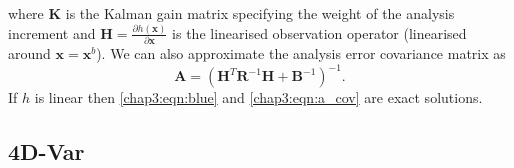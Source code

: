 where \textbf{K} is the Kalman gain matrix specifying the weight of the analysis increment and \(\textbf{H}=\frac{\partial h(\textbf{x})}{\partial \textbf{x}}\) is the linearised observation operator (linearised around \(\textbf{x}=\textbf{x}^{b}\)). We can also approximate the analysis error covariance matrix as
\begin{equation}
\textbf{A} = (\textbf{H}^{T}\textbf{R}^{-1}\textbf{H}+\textbf{B}^{-1})^{-1}. \label{chap3:eqn:a_cov}
\end{equation}
If \( h \) is linear then \eqref{chap3:eqn:blue} and \eqref{chap3:eqn:a_cov} are exact solutions.


\subsection{4D-Var} \label{chap3:sec:4dvar}

